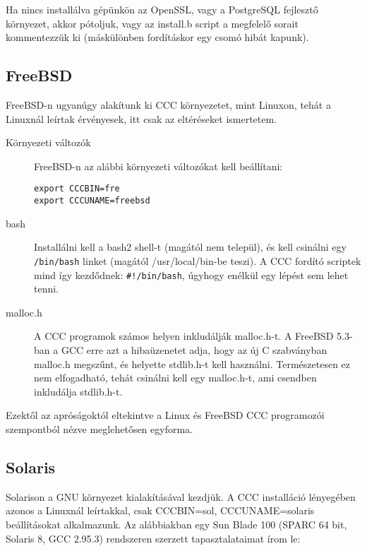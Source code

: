 Ha nincs installálva gépünkön az OpenSSL, vagy a PostgreSQL
fejlesztő környezet, akkor pótoljuk, vagy az install.b script
a megfelelő sorait kommentezzük ki (máskülönben fordításkor
egy csomó hibát kapunk).
                    

\subsection{FreeBSD}

FreeBSD-n ugyanúgy alakítunk ki  CCC környezetet, 
mint Linuxon, tehát a Linuxnál leírtak érvényesek,
itt csak az eltéréseket ismertetem.

\begin{description}
\item[Környezeti változók]
FreeBSD-n az alábbi környezeti változókat kell beállítani:
\begin{verbatim}
export CCCBIN=fre
export CCCUNAME=freebsd
\end{verbatim}
\item[bash]
Installálni kell a bash2 shell-t (magától nem települ), 
és kell csinálni egy \verb!/bin/bash! linket (magától
/usr/local/bin-be teszi). A CCC fordító scriptek
mind így kezdődnek: \verb|#!/bin/bash|, úgyhogy enélkül 
egy lépést sem lehet tenni.

\item[malloc.h]
A CCC programok számos helyen inkludálják malloc.h-t.
A FreeBSD 5.3-ban a GCC erre azt a hibaüzenetet adja, 
hogy az új C szabványban  malloc.h megszűnt, és helyette 
stdlib.h-t kell használni. Természetesen ez nem elfogadható,
tehát csinálni kell egy malloc.h-t, ami csendben inkludálja
stdlib.h-t.
\end{description}

Ezektől az apróságoktól eltekintve a Linux és FreeBSD
CCC programozói szempontból nézve meglehetősen egyforma.


\subsection{Solaris}
Solarison a GNU környezet kialakításával kezdjük.
A CCC installáció lényegében azonos a Linuxnál leírtakkal,
csak CCCBIN=sol, CCCUNAME=solaris beállításokat alkalmazunk.
Az alábbiakban egy Sun Blade 100 (SPARC 64 bit, Solaris 8, GCC 2.95.3)
rendszeren szerzett tapasztalataimat írom le:

